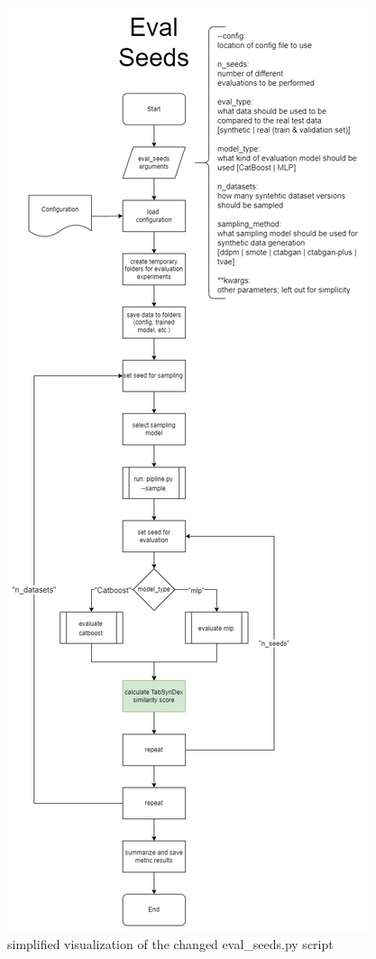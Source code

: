 \begin{figure}[H]
	\centering
	\includegraphics[height=0.9\textheight]{images/eval_seed-CHANGED.png}
	\caption[Evaluate Seeds Changes]{simplified visualization of the changed eval\_seeds.py script}
\end{figure}

